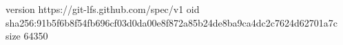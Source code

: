 version https://git-lfs.github.com/spec/v1
oid sha256:91b5f6b8f54fb696cf03d0da00e8f872a85b24de8ba9ca4dc2c7624d62701a7c
size 64350
